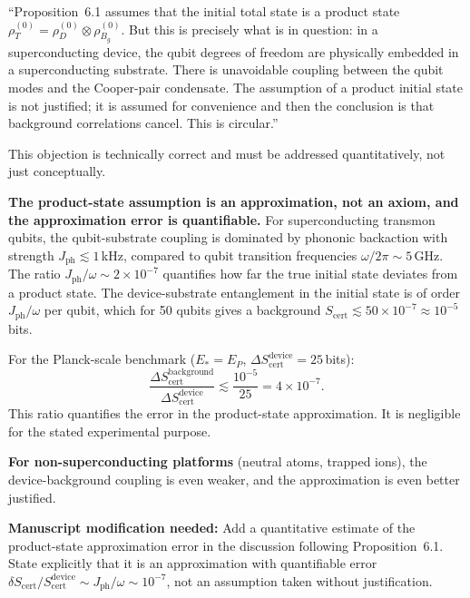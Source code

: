 \documentclass[11pt,letterpaper]{article}
\newcommand{\Scert}{S_{\mathrm{cert}}}
\begin{document}
\begin{tcolorbox}[breakable,enhanced,colback=red!3,colframe=red!60!black,
  fonttitle=\bfseries,title={Referee Objection 2: The Cancellation Proposition assumes what it needs to prove},
  boxrule=0.8pt]
``Proposition~6.1 assumes that the initial total state is a product state
$\rho_T^{(0)} = \rho_D^{(0)} \otimes \rho_{B_g}^{(0)}$.  But this is precisely what
is in question: in a superconducting device, the qubit degrees of freedom are physically
embedded in a superconducting substrate.  There is unavoidable coupling between the qubit
modes and the Cooper-pair condensate.  The assumption of a product initial state is not
justified; it is assumed for convenience and then the conclusion is that background
correlations cancel.  This is circular.''
\end{tcolorbox}

\begin{tcolorbox}[breakable,enhanced,colback=green!3,colframe=green!55!black,
  fonttitle=\bfseries,title={Response},boxrule=0.8pt]
This objection is technically correct and must be addressed quantitatively, not
just conceptually.

\textbf{The product-state assumption is an approximation, not an axiom, and the
approximation error is quantifiable.}  For superconducting transmon qubits, the
qubit-substrate coupling is dominated by phononic backaction with strength
$J_{\mathrm{ph}} \lesssim 1$\,kHz, compared to qubit transition frequencies
$\omega/2\pi \sim 5$\,GHz.  The ratio $J_{\mathrm{ph}}/\omega \sim 2\times10^{-7}$
quantifies how far the true initial state deviates from a product state.  The device-substrate
entanglement in the initial state is of order $J_{\mathrm{ph}}/\omega$ per qubit,
which for 50 qubits gives a background $\Scert \lesssim 50 \times 10^{-7} \approx 10^{-5}$\,bits.

For the Planck-scale benchmark ($E_* = E_P$, $\Delta\Scert^{\mathrm{device}} = 25$\,bits):
\[
\frac{\Delta\Scert^{\mathrm{background}}}{\Delta\Scert^{\mathrm{device}}}
\lesssim \frac{10^{-5}}{25} = 4\times10^{-7}.
\]
This ratio quantifies the error in the product-state approximation.  It is negligible
for the stated experimental purpose.

\textbf{For non-superconducting platforms} (neutral atoms, trapped ions), the
device-background coupling is even weaker, and the approximation is even better justified.

\textbf{Manuscript modification needed:} Add a quantitative estimate of the
product-state approximation error in the discussion following Proposition~6.1.
State explicitly that it is an approximation with quantifiable error
$\delta\Scert/\Scert^{\mathrm{device}} \sim J_{\mathrm{ph}}/\omega \sim 10^{-7}$,
not an assumption taken without justification.
\end{tcolorbox}
\end{document}
